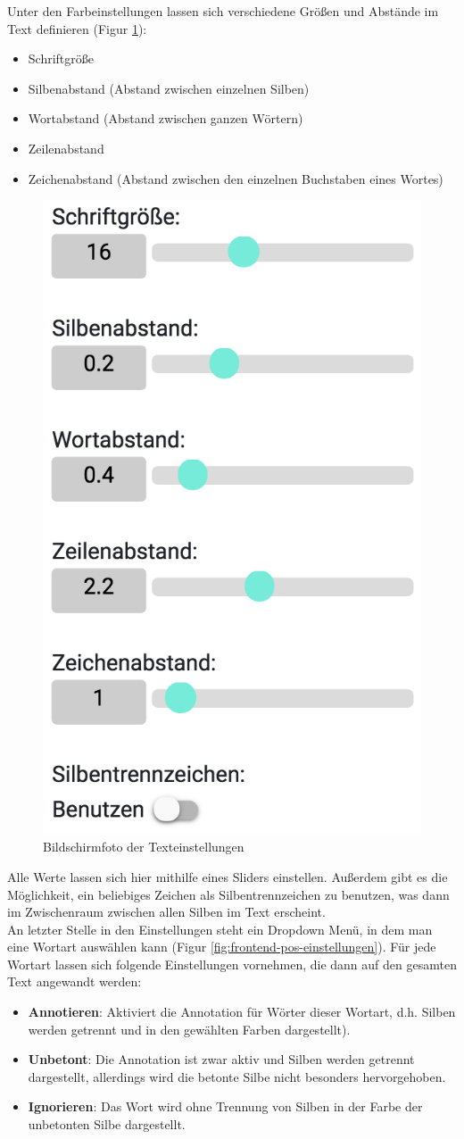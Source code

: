 Unter den Farbeinstellungen lassen sich verschiedene Größen und Abstände im Text definieren (Figur \ref{fig:frontend-textconf}):
\begin{itemize}
	\item Schriftgröße
	\item Silbenabstand (Abstand zwischen einzelnen Silben)
	\item Wortabstand (Abstand zwischen ganzen Wörtern)
	\item Zeilenabstand
	\item Zeichenabstand (Abstand zwischen den einzelnen Buchstaben eines Wortes)
\end{itemize}

\begin{figure}[h!]
	\centering
	\includegraphics[width=.4\linewidth, frame]{figures/frontend/config-text}
	\caption{Bildschirmfoto der Texteinstellungen}
	\label{fig:frontend-textconf}
\end{figure}

Alle Werte lassen sich hier mithilfe eines Sliders einstellen. Außerdem gibt es die Möglichkeit, ein beliebiges Zeichen als Silbentrennzeichen zu benutzen, was dann im Zwischenraum zwischen allen Silben im Text erscheint.\\

An letzter Stelle in den Einstellungen steht ein Dropdown Menü, in dem man eine Wortart auswählen kann (Figur \ref{fig:frontend-pos-einstellungen}). Für jede Wortart lassen sich folgende Einstellungen vornehmen, die dann auf den gesamten Text angewandt werden:
\begin{itemize}
	\item \textbf{Annotieren}: Aktiviert die Annotation für Wörter dieser Wortart, d.h. Silben werden getrennt und in den gewählten Farben dargestellt).
	
	\item \textbf{Unbetont}: Die Annotation ist zwar aktiv und Silben werden getrennt dargestellt, allerdings wird die betonte Silbe nicht besonders hervorgehoben.
	
	\item \textbf{Ignorieren}: Das Wort wird ohne Trennung von Silben in der Farbe der unbetonten Silbe dargestellt.
\end{itemize}

